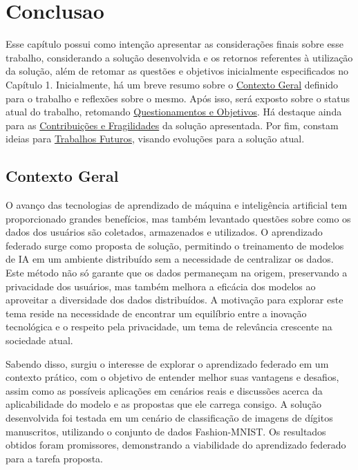 \chapter[Conclusao]{Conclusao}
\label{chap:conclusao}

Esse capítulo possui como intenção apresentar as considerações finais sobre esse trabalho, considerando a solução desenvolvida e os retornos referentes à utilização da solução, além de retomar as questões e objetivos inicialmente especificados no Capítulo 1. Inicialmente, há um breve resumo sobre o \hyperref[sec:contexto]{Contexto Geral} definido para o trabalho e reflexões sobre o mesmo. Após isso, será exposto sobre o status atual do trabalho, retomando \hyperref[sec:questionamentos]{Questionamentos e Objetivos}. Há destaque ainda para as \hyperref[sec:contribuicoes]{Contribuições e Fragilidades} da solução apresentada.  Por fim, constam ideias para \hyperref[sec:trabalhos-futuros]{Trabalhos Futuros}, visando evoluções para a solução atual.

\section{Contexto Geral}
\label{sec:contexto}

O avanço das tecnologias de aprendizado de máquina e inteligência artificial tem proporcionado grandes benefícios, mas também levantado questões sobre como os dados dos usuários são coletados, armazenados e utilizados. O aprendizado federado surge como proposta de solução, permitindo o treinamento de modelos de IA em um ambiente distribuído sem a necessidade de centralizar os dados. Este método não só garante que os dados permaneçam na origem, preservando a privacidade dos usuários, mas também melhora a eficácia dos modelos ao aproveitar a diversidade dos dados distribuídos. A motivação para explorar este tema reside na necessidade de encontrar um equilíbrio entre a inovação tecnológica e o respeito pela privacidade, um tema de relevância crescente na sociedade atual.

Sabendo disso, surgiu o interesse de explorar o aprendizado federado em um contexto prático, com o objetivo de entender melhor suas vantagens e desafios, assim como as possíveis aplicações em cenários reais e discussões acerca da aplicabilidade do modelo e as propostas que ele carrega consigo. A solução desenvolvida foi testada em um cenário de classificação de imagens de dígitos manuscritos, utilizando o conjunto de dados Fashion-MNIST. Os resultados obtidos foram promissores, demonstrando a viabilidade do aprendizado federado para a tarefa proposta.

